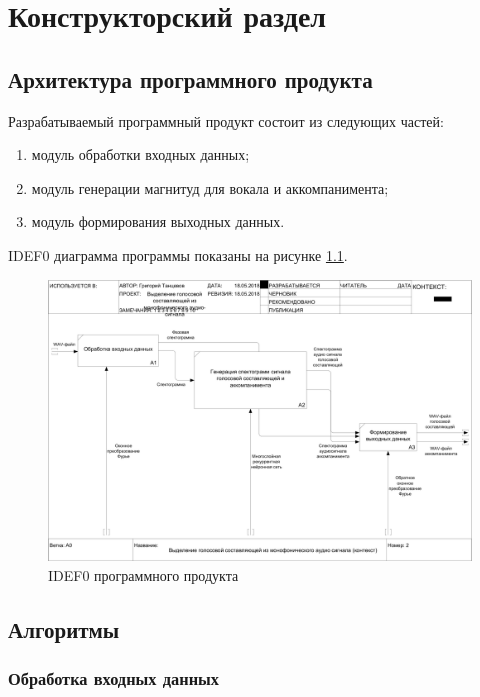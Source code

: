 \chapter{Конструкторский раздел}
\label{cha:design}

\section{Архитектура программного продукта}

Разрабатываемый программный продукт состоит из следующих частей:

\begin{enumerate}
	\item модуль обработки входных данных;
	\item модуль генерации магнитуд для вокала и аккомпанимента;
	\item модуль формирования выходных данных.
\end{enumerate}

IDEF0 диаграмма программы показаны на рисунке \ref{des:idef0}.

\begin{figure}
	\centering
	\includegraphics[width=\textwidth]{inc/img/02_A0}
	\caption{IDEF0 программного продукта}
	\label{des:idef0}
\end{figure}

\section{Алгоритмы}

\subsection{Обработка входных данных}

